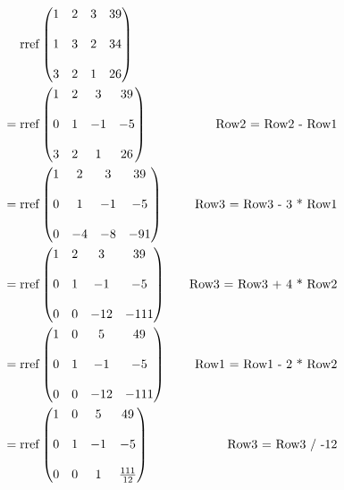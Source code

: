 \documentclass{article}
\begin{document}
\begin{align*}
\mathop{\rm rref} & \begin{pmatrix}
1 & 2 & 3 & 39 \\ \\
1 & 3 & 2 & 34 \\ \\
3 & 2 & 1 & 26
\end{pmatrix} \\
= \mathop{\rm rref} & \begin{pmatrix}
1 & 2 & 3 & 39 \\ \\
0 & 1 & -1 & -5 \\ \\
3 & 2 & 1 & 26
\end{pmatrix} \quad &\text{Row2 = Row2 - Row1}  \\
= \mathop{\rm rref} & \begin{pmatrix}
1 & 2 & 3 & 39 \\ \\
0 & 1 & -1 & -5 \\ \\
0 & -4 & -8 & -91
\end{pmatrix} \quad &\text{Row3 = Row3 - 3 * Row1} \\
= \mathop{\rm rref} & \begin{pmatrix}
1 & 2 & 3 & 39 \\ \\
0 & 1 & -1 & -5 \\ \\
0 & 0 & -12 & -111
\end{pmatrix} \quad &\text{Row3 = Row3 + 4 * Row2} \\
= \mathop{\rm rref} & \begin{pmatrix}
1 & 0 & 5 & 49 \\ \\
0 & 1 & -1 & -5 \\ \\
0 & 0 & -12 & -111
\end{pmatrix} &\text{Row1 = Row1 - 2 * Row2} \\
= \mathop{\rm rref} & \begin{pmatrix}
1 & 0 & 5 & 49 \\ \\
0 & 1 & -1 & -5 \\ \\
0 & 0 & 1 & \frac{111}{12}
\end{pmatrix} \quad &\text{Row3 = Row3 / -12} \\

\end{align*}
\end{document}
